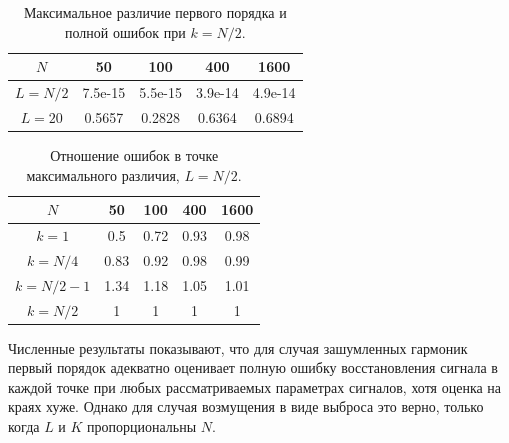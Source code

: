 \documentclass[specialist,
               substylefile = spbu.rtx,
               subf,href,colorlinks=true, 12pt]{disser}
\begin{document}
\begin{table}[H]
	\begin{center}
		\caption{Максимальное различие первого порядка и полной ошибок при $k = N / 2$.}
		\label{tab:const_outl_2}
		\begin{tabular}{|c|c|c|c|c|}
			\hline
			$N$	& 50 & 100 & 400 & 1600 \\
			\hline
			$L = N / 2$ & 7.5e-15  & 5.5e-15  & 3.9e-14 & 4.9e-14 \\
			\hline
			$L = 20$ & 0.5657  & 0.2828  & 0.6364 & 0.6894 \\
			\hline
		\end{tabular}
	\end{center}
\end{table}

\begin{table}[H]
	\begin{center}
		\caption{Отношение ошибок в точке максимального различия, $L = N/2$.}
		\label{tab:const_outl_ratio}
		\begin{tabular}{|c|c|c|c|c|}
			\hline
			$N$	& 50 & 100 & 400 & 1600 \\
			\hline
			$k = 1$ & 0.5  & 0.72  & 0.93 & 0.98 \\
			\hline
			$k = N/4$ & 0.83  & 0.92  & 0.98 & 0.99 \\
			\hline
			$k = N/2 - 1$ & 1.34  & 1.18  & 1.05 & 1.01 \\
			\hline
			$k = N/2$ & 1  & 1  & 1 & 1 \\
			\hline
		\end{tabular}
	\end{center}
\end{table}

Численные результаты показывают, что для случая зашумленных гармоник первый порядок адекватно оценивает полную ошибку восстановления сигнала в каждой точке при любых рассматриваемых параметрах сигналов, хотя оценка на краях хуже.
Однако для случая возмущения в виде выброса это верно, только когда $L$ и $K$ пропорциональны $N$.
\end{document}
